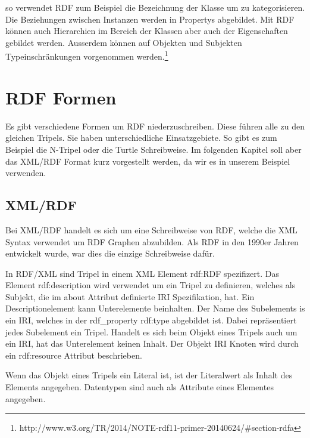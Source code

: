 so verwendet RDF zum Beispiel die Bezeichnung der Klasse um zu kategorisieren. Die Beziehungen zwischen Instanzen werden in Propertys abgebildet. Mit RDF können auch Hierarchien im Bereich der Klassen aber auch der Eigenschaften gebildet werden. Ausserdem können auf Objekten und Subjekten Typeinschränkungen vorgenommen werden.\footnote{http://www.w3.org/TR/2014/NOTE-rdf11-primer-20140624/\#section-rdfa\cite{w3rdf}}

\section{RDF Formen}
\label{sec:rdf_rdf_formen}

Es gibt verschiedene Formen um RDF niederzuschreiben. Diese führen alle zu den gleichen Tripels. Sie haben unterschiedliche Einsatzgebiete. So gibt es zum Beispiel die N-Tripel oder die Turtle Schreibweise. Im folgenden Kapitel soll aber das XML/RDF Format kurz vorgestellt werden, da wir es in unserem Beispiel verwenden.

\subsection{XML/RDF}
\label{sec:rdf_rdf_formen_xmlRdf}
Bei XML/RDF handelt es sich um eine Schreibweise von RDF, welche die XML Syntax verwendet um  RDF Graphen abzubilden. Als RDF in den 1990er Jahren entwickelt wurde, war dies die einzige Schreibweise dafür. 

In RDF/XML sind Tripel in einem XML Element rdf:RDF spezifizert.  Das Element rdf:description wird verwendet um ein Tripel zu definieren, welches als Subjekt, die im about Attribut definierte IRI Spezifikation, hat. Ein Descriptionelement kann Unterelemente beinhalten. Der Name des Subelements is ein IRI, welches in der rdf\_property rdf:type abgebildet ist. Dabei repräsentiert jedes Subelement ein Tripel. Handelt es sich beim Objekt eines Tripels auch um ein IRI, hat das Unterelement keinen Inhalt. Der Objekt IRI Knoten wird durch ein rdf:resource Attribut beschrieben.

Wenn das Objekt eines Tripels ein Literal ist, ist der Literalwert als Inhalt des Elements angegeben. Datentypen sind auch als Attribute eines Elementes angegeben. 

